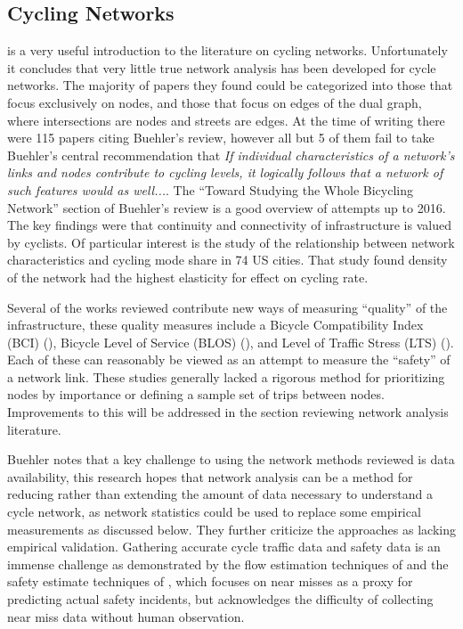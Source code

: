 \subsection{Cycling Networks}

\cite{buehler2016bikeway} is a very useful introduction to the literature on cycling networks. Unfortunately it concludes that very little true network analysis has been developed for cycle networks. The majority of papers they found could be categorized into those that focus exclusively on nodes, and those that focus on edges of the dual graph, where intersections are nodes and streets are edges. At the time of writing there were 115 papers citing Buehler's review, however all but 5 of them fail to take Buehler's central recommendation that \textit{If individual characteristics of a network's links and nodes contribute to cycling levels, it logically follows that a network of such features would as well...}. The ``Toward Studying the Whole Bicycling Network'' section of Buehler's review is a good overview of attempts up to 2016. The key findings were that continuity and connectivity of infrastructure is valued by cyclists. Of particular interest is the \cite{schoner2014missing} study of the relationship between network characteristics and cycling mode share in 74 US cities. That study found density of the network had the highest elasticity for effect on cycling rate. 

Several of the works reviewed contribute new ways of measuring ``quality'' of the infrastructure, these quality measures include a Bicycle Compatibility Index (BCI) (\cite{klobucar2007network}),  Bicycle Level of Service (BLOS) (\cite{lowry2012assessment}), and Level of Traffic Stress (LTS) (\cite{mekuria2012low}). Each of these can reasonably be viewed as an attempt to measure the ``safety'' of a network link. These studies generally lacked a rigorous method for prioritizing nodes by importance or defining a sample set of trips between nodes. Improvements to this will be addressed in the section reviewing network analysis literature. 

Buehler notes that a key challenge to using the network methods reviewed is data availability, this research hopes that network analysis can be a method for reducing rather than extending the amount of data necessary to understand a cycle network, as network statistics could be used to replace some empirical measurements as discussed below.  They further criticize the approaches as lacking empirical validation. Gathering accurate cycle traffic data and safety data is an immense challenge as demonstrated by the flow estimation techniques of \cite{gosse2014estimating} and the safety estimate techniques of \cite{puchades2018role}, which focuses on near misses as a proxy for predicting actual safety incidents, but acknowledges the difficulty of collecting near miss data without human observation. 

